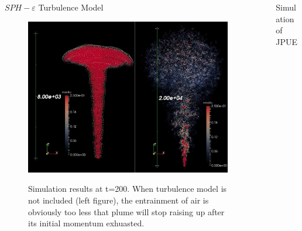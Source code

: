 \documentclass[final]{beamer}
\newlength{\sepwid}
\newlength{\onecolwid}
\newlength{\twocolwid}
\begin{document}
\begin{frame}[t]
\begin{columns}[t]
\begin{column}{\onecolwid}
\begin{block}{ $SPH-\varepsilon$ Turbulence Model \cite{monaghan2011turbulence}}
\begin{figure}
\centering
{\includegraphics[scale=0.85]{effect_of_turb_model}}
\caption{Simulation results at t=200. When turbulence model is not included (left figure), the entrainment of air is obviously too less that plume will stop raising up after its initial momentum exhuasted.}
\label{fig:effect_of_turbulence}
\end{figure}

\end{block}

\end{column} %


\begin{column}{\sepwid}\end{column} %

\begin{column}{\twocolwid} %

\begin{columns}[t,totalwidth=\twocolwid] %

\begin{column}{\onecolwid}\vspace{-1.4in} %

\begin{block}{Simulation of JPUE}


\end{block}
\end{column}
\end{columns}
\end{column}
\end{columns}
\end{frame}
\end{document}
